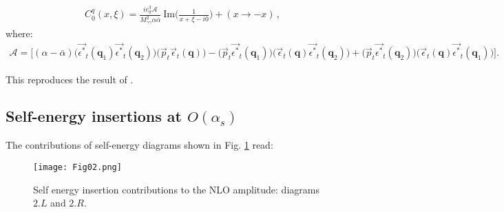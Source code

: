 \documentclass[aps,prd,superscriptaddress,floatfix,showpacs]{revtex4}
\begin{document}
 \begin{equation}\label{eq-Cq0-recap}
\begin{aligned}
	&C^q_0 (x, \xi) = \frac{ie_q^3\mathcal{A} }{ M^2_{\gamma\gamma} \alpha \bar{\alpha} } \: \mathrm{Im} \Big( \frac{1}{x+\xi - i0}  \Big) + ( x \rightarrow -x)\,,
	\end{aligned}
\end{equation}
where:
\begin{equation}
\begin{aligned}	    
\mathcal{A}=	\bigg[(\alpha - \bar{\alpha} )\big( \vec{\epsilon^*}_t(\mathbf{q}_1) \vec{\epsilon^*}_t(\mathbf{q}_2) \big) \big( \vec{p}_t \vec{\epsilon}_t (\mathbf{q}) \big)  - \big(  \vec{p}_t \vec{\epsilon^*}_t(\mathbf{q}_1) \big) \big(  \vec{\epsilon}_t (\mathbf{q}) \vec{\epsilon^*}_t(\mathbf{q}_2) \big) + \big(  \vec{p}_t \vec{\epsilon^*}_t(\mathbf{q}_2) \big) \big(  \vec{\epsilon}_t(\mathbf{q}) \vec{\epsilon^*}_t(\mathbf{q}_1) \big) \bigg]  .
\end{aligned}
\end{equation}

This reproduces the result of  \cite{Pedrak:2017cpp}. 

\subsection{Self-energy insertions at $O(\alpha_s)$}


The contributions of self-energy diagrams shown in Fig. \ref{2LR} read:
\begin{figure}[h]
        \centering
\texttt{[image: Fig02.png]}
    \caption{Self energy insertion contributions to the NLO amplitude: diagrams $2.L$ and $2.R$.}
    \label{2LR}
\end{figure}
\end{document}
